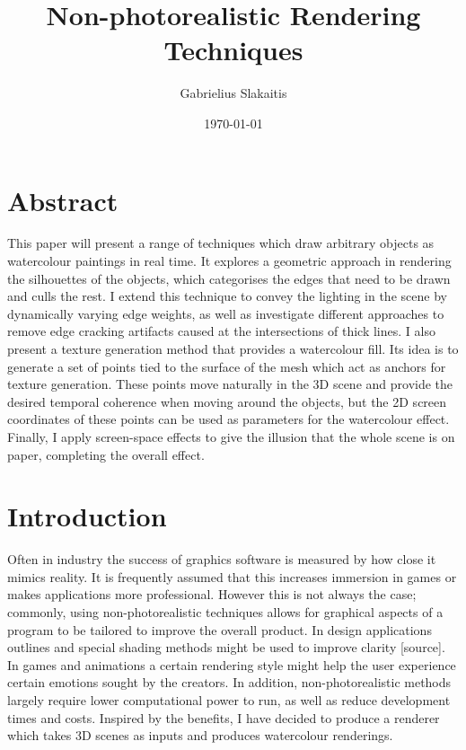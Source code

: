 \documentclass[a4paper, 12pt]{article}
\begin{document}
\title{Non-photorealistic Rendering Techniques}
\author{Gabrielius Slakaitis}
\date{\today}
\maketitle

\newpage



\section{Abstract}

This paper will present a range of techniques which draw arbitrary objects as watercolour paintings in real time. It explores a geometric approach in rendering the silhouettes of the objects, which categorises the edges that need to be drawn and culls the rest. I extend this technique to convey the lighting in the scene by dynamically varying edge weights, as well as investigate different approaches to remove edge cracking artifacts caused at the intersections of thick lines. I also present a texture generation method that provides a watercolour fill. Its idea is to generate a set of points tied to the surface of the mesh which act as anchors for texture generation. These points move naturally in the 3D scene and provide the desired temporal coherence when moving around the objects, but the 2D screen coordinates of these points can be used as parameters for the watercolour effect. Finally, I apply screen-space effects to give the illusion that the whole scene is on paper, completing the overall effect.



\section{Introduction}

Often in industry the success of graphics software is measured by how close it mimics reality. It is frequently assumed that this increases immersion in games or makes applications more professional. However this is not always the case; commonly, using non-photorealistic techniques allows for graphical aspects of a program to be tailored to improve the overall product. In design applications outlines and special shading methods might be used to improve clarity [source]. In games and animations a certain rendering style might help the user experience certain emotions sought by the creators. In addition, non-photorealistic methods largely require lower computational power to run, as well as reduce development times and costs. Inspired by the benefits, I have decided to produce a renderer which takes 3D scenes as inputs and produces watercolour renderings.
\end{document}
